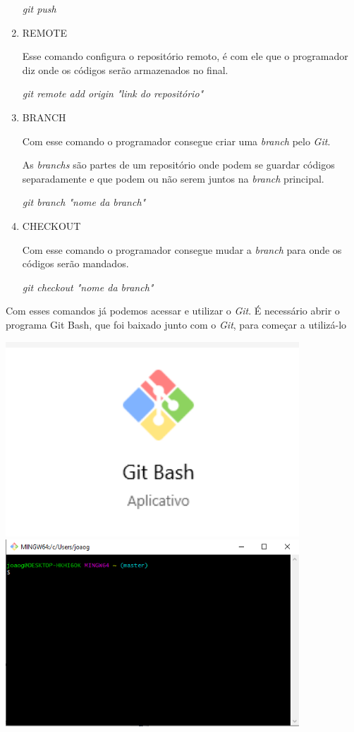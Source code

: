 \documentclass{article}
\begin{document}
\begin{enumerate}
    \textit{git push}
    \item REMOTE
    
    \hspace{4mm}Esse comando configura o repositório remoto, é com ele que o programador diz onde os códigos serão armazenados no final. 
    
    \textit{git remote add origin "link do repositório"}
    \item BRANCH
    
    \hspace{4mm}Com esse comando o programador consegue criar uma \textit{branch} pelo \textit{Git}. 
    
    As \textit{branchs} são partes de um repositório onde podem se guardar códigos separadamente e que podem ou não serem juntos na \textit{branch} principal.
    
    \textit{git branch "nome da branch"}
    \item CHECKOUT
    
    \hspace{4mm}Com esse comando o programador consegue mudar a \textit{branch} para onde os códigos serão mandados.
    
    \textit{git checkout "nome da branch"}
\end{enumerate}

\hspace{4mm}Com esses comandos já podemos acessar e utilizar o \textit{Git}. É necessário abrir o programa Git Bash, que foi baixado junto com o \textit{Git}, para começar a utilizá-lo

\includegraphics[width = 11cm]{images/gitBashIcone.png}\\
\includegraphics[width = 11cm]{images/gitBashInterface.png}  
\end{document}
